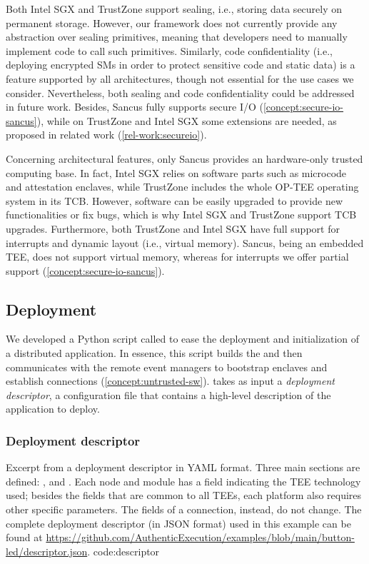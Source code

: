 Both Intel \ac{SGX} and TrustZone support sealing, i.e., storing data securely
on permanent storage. However, our framework does not currently provide any
abstraction over sealing primitives, meaning that developers need to manually
implement code to call such primitives. Similarly, code confidentiality (i.e.,
deploying encrypted \acp{SM} in order to protect sensitive code and static data)
is a feature supported by all architectures, though not essential for the use
cases we consider. Nevertheless, both sealing and code confidentiality could be
addressed in future work. Besides, Sancus fully supports secure I/O
(\cref{concept:secure-io-sancus}), while on TrustZone and Intel \ac{SGX} some
extensions are needed, as proposed in related work (\cref{rel-work:secureio}).

Concerning architectural features, only Sancus provides an hardware-only trusted
computing base. In fact, Intel \ac{SGX} relies on software parts such as
microcode and attestation enclaves, while TrustZone includes the whole OP-TEE
operating system in its \ac{TCB}. However, software can be easily upgraded to
provide new functionalities or fix bugs, which is why Intel \ac{SGX} and
TrustZone support \ac{TCB} upgrades. Furthermore, both TrustZone and Intel
\ac{SGX} have full support for interrupts and dynamic layout (i.e., virtual
memory). Sancus, being an embedded \ac{TEE}, does not support virtual memory,
whereas for interrupts we offer partial support
(\cref{concept:secure-io-sancus}).

\subsection{Deployment}
%
\label{impl:deployment}

We developed a Python script called \reactools{} to ease the deployment and
initialization of a distributed application. In essence, this script
builds the \protmods{} and then communicates with the remote event managers to
bootstrap enclaves and establish connections (\cref{concept:untrusted-sw}).
\reactools{} takes as input a \emph{deployment descriptor}, a configuration file
that contains a high-level description of the application to deploy. 

\subsubsection{Deployment descriptor} 

%
  {}%
  {}%
  {Excerpt from a deployment descriptor in YAML format. Three main sections are
  defined: ,  and . Each node and
  module has a  field indicating the \ac{TEE} technology used;
  besides the fields that are common to all \acp{TEE}, each platform also
  requires other specific parameters. The fields of a connection, instead, do
  not change. The complete deployment descriptor (in JSON format) used in this
  example  can be found at
  \url{https://github.com/AuthenticExecution/examples/blob/main/button-led/descriptor.json}.}%
  {code:descriptor}

